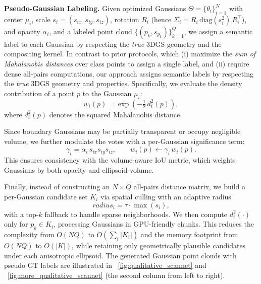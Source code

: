 \noindent\textbf{Pseudo-Gaussian Labeling.}
Given optimized Gaussians 
$\Theta=\{\theta_i\}_{i=1}^N$ 
with center $\mu_i$, scale $s_i=(s_{ix},s_{iy},s_{iz})$, rotation $R_i$ 
(hence $\Sigma_i = R_i \,\mathrm{diag}(s_i^2)\,R_i^\top$), and opacity $\alpha_i$, 
and a labeled point cloud $\{(p_k,s_{p_k})\}_{k=1}^Q$, 
we assign a semantic label to each Gaussian by respecting the \emph{true} 3DGS geometry 
and the compositing kernel. 
In contrast to prior protocols, which (i) maximize the \emph{sum of Mahalanobis distances} over class points to assign a single label, and (ii) require dense all-pairs computations, our approach assigns semantic labels by respecting the \emph{true} 3DGS geometry and properties.
Specifically, we evaluate the density contribution of a point $p$ to the Gaussian $\mu_i$:
\begin{equation}
w_i(p) = \exp\!\left(-\tfrac{1}{2}\, d_i^2(p)\right),
\end{equation}
where $d_i^2(p)$ denotes the squared Mahalanobis distance.

Since boundary Gaussians may be partially transparent or occupy negligible volume, 
we further modulate the votes with a per-Gaussian significance term:
\begin{equation}
\gamma_i = \alpha_i \, s_{ix} s_{iy} s_{iz}, 
\quad\quad
w_i(p) \leftarrow \gamma_i \, w_i(p).
\end{equation}
This ensures consistency with the volume-aware IoU metric, which weights Gaussians by both opacity and ellipsoid volume.

Finally, instead of constructing an $N\times Q$ all-pairs distance matrix, we build a per-Gaussian candidate set $K_i$ via spatial culling with an adaptive radius
\[
radius_i = \tau \cdot \max(s_i),
\]
with a top-$k$ fallback to handle sparse neighborhoods. 
We then compute $d_i^2(\cdot)$ only for $p_k \in K_i$, 
processing Gaussians in GPU-friendly chunks. 
This reduces the complexity from $O(NQ)$ to $O(\sum_i |K_i|)$ 
and the memory footprint from $O(NQ)$ to $O(|K|)$, 
while retaining only geometrically plausible candidates under each anisotropic ellipsoid. The generated Gaussian point clouds with pseudo GT labels are illustrated in \figureautorefname~\ref{fig:qualitative_scannet} and \figureautorefname~\ref{fig:more_qualitative_scannet} (the second column from left to right). 


